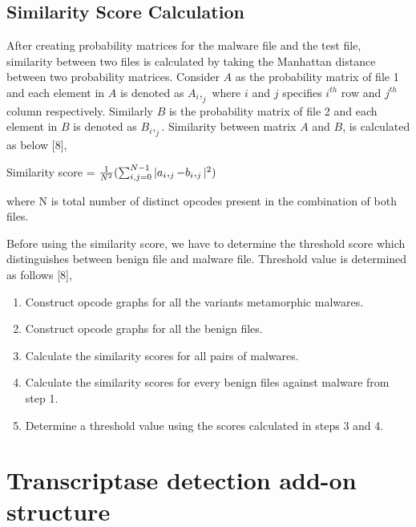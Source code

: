 \subsection{Similarity Score Calculation}
After creating probability matrices for the malware file and the test file, similarity between two files is calculated by taking the Manhattan distance between two probability matrices. Consider $A$ as the probability matrix of file 1 and each element in $A$ is denoted as $A_i,_j$ where $i$ and $j$ specifies $i^{th}$ row and $j^{th}$ column respectively. Similarly $B$ is the probability matrix of file 2 and each element in $B$ is denoted as $B_i,_j$. Similarity between matrix $A$ and $B$, is calculated as below [8],

Similarity score = ${1 \over N^2}(\sum_{i,j=0}^{N-1}|a_i,_j-b_i,_j|^2)$ 

where N is total number of distinct opcodes present in the combination of both files.

Before using the similarity score, we have to determine the threshold score which distinguishes between benign file and malware file. Threshold value is determined as follows [8],
\begin{enumerate}
\item Construct opcode graphs for all the variants metamorphic malwares.
\item Construct opcode graphs for all the benign files.
\item Calculate the similarity scores for all pairs of malwares.
\item Calculate the similarity scores for every benign files against malware from step 1.
\item Determine a threshold value using the scores calculated in steps 3 and 4.
\end{enumerate}

\section{Transcriptase detection add-on structure}

